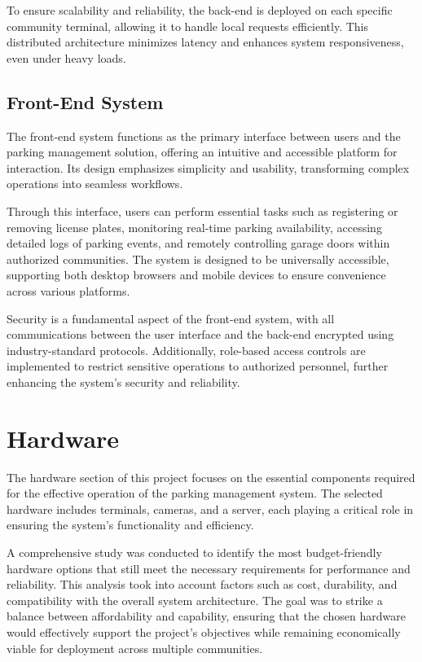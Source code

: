 To ensure scalability and reliability, the back-end is deployed on each specific community terminal, allowing it to handle local requests efficiently. This distributed architecture minimizes latency and enhances system responsiveness, even under heavy loads.

\subsection{Front-End System}

The front-end system functions as the primary interface between users and the parking management solution, offering an intuitive and accessible platform for interaction. Its design emphasizes simplicity and usability, transforming complex operations into seamless workflows.

Through this interface, users can perform essential tasks such as registering or removing license plates, monitoring real-time parking availability, accessing detailed logs of parking events, and remotely controlling garage doors within authorized communities. The system is designed to be universally accessible, supporting both desktop browsers and mobile devices to ensure convenience across various platforms.

Security is a fundamental aspect of the front-end system, with all communications between the user interface and the back-end encrypted using industry-standard protocols. Additionally, role-based access controls are implemented to restrict sensitive operations to authorized personnel, further enhancing the system's security and reliability.

\section{Hardware}

The hardware section of this project focuses on the essential components required for the effective operation of the parking management system. The selected hardware includes terminals, cameras, and a server, each playing a critical role in ensuring the system's functionality and efficiency.

A comprehensive study was conducted to identify the most budget-friendly hardware options that still meet the necessary requirements for performance and reliability. This analysis took into account factors such as cost, durability, and compatibility with the overall system architecture. The goal was to strike a balance between affordability and capability, ensuring that the chosen hardware would effectively support the project's objectives while remaining economically viable for deployment across multiple communities.

